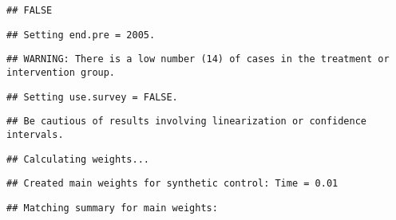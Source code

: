 \documentclass[
]{article}
\begin{document}
\begin{verbatim}
## FALSE
\end{verbatim}

\begin{verbatim}
## Setting end.pre = 2005.
\end{verbatim}

\begin{verbatim}
## WARNING: There is a low number (14) of cases in the treatment or intervention group.
\end{verbatim}

\begin{verbatim}
## Setting use.survey = FALSE.
\end{verbatim}

\begin{verbatim}
## Be cautious of results involving linearization or confidence intervals.
\end{verbatim}

\begin{verbatim}
## Calculating weights...
\end{verbatim}

\begin{verbatim}
## Created main weights for synthetic control: Time = 0.01
\end{verbatim}

\begin{verbatim}
## Matching summary for main weights:
\end{verbatim}
\end{document}
